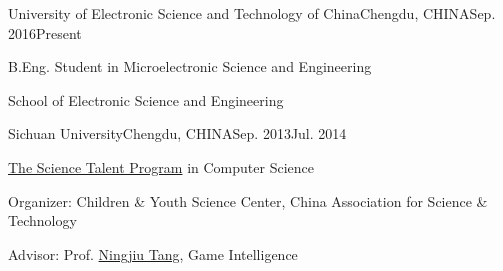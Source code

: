 
\begin{eduitem}{University of Electronic Science and Technology of China}{Chengdu, CHINA}{Sep. 2016}{Present}
\item B.Eng. Student in Microelectronic Science and Engineering
\item School of Electronic Science and Engineering
\end{eduitem}

\begin{eduitem}{Sichuan University}{Chengdu, CHINA}{Sep. 2013}{Jul. 2014}
\item \href{http://ycjh.org}{The Science Talent Program} in Computer Science 
\item Organizer: Children \& Youth Science Center, China Association for Science \& Technology
\item Advisor: Prof. \href{http://cs.scu.edu.cn/info/1074/3930.htm}{Ningjiu Tang}, Game Intelligence
\end{eduitem}


\endinput